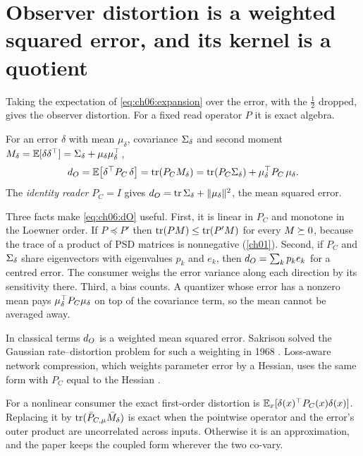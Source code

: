 
\section{Observer distortion is a weighted squared error, and its kernel is a quotient}\label{sec:ch06:distortion}

Taking the expectation of \cref{eq:ch06:expansion} over the error, with the $\tfrac12$ dropped, gives the observer distortion. For a fixed read operator $P$ it is exact algebra.

\begin{definition}\label{def:ch06:dO}
For an error $\delta$ with mean $\mu_\delta$, covariance $\Sigma_\delta$ and second moment $M_\delta=\mathbb{E}[\delta\delta^{\top}]=\Sigma_\delta+\mu_\delta\mu_\delta^{\top}$,
\begin{equation}\label{eq:ch06:dO}
d_O=\mathbb{E}\big[\delta^{\top} P_C\,\delta\big]=\operatorname{tr}(P_C M_\delta)=\operatorname{tr}(P_C\Sigma_\delta)+\mu_\delta^{\top} P_C\,\mu_\delta .
\end{equation}
The \emph{identity reader} $P_C=I$ gives $d_O=\operatorname{tr}\Sigma_\delta+\lVert \mu_\delta\rVert^2$, the mean squared error.
\end{definition}

Three facts make \cref{eq:ch06:dO} useful. First, it is linear in $P_C$ and monotone in the Loewner order. If $P\preceq P'$ then $\operatorname{tr}(P M)\le\operatorname{tr}(P' M)$ for every $M\succeq 0$, because the trace of a product of PSD matrices is nonnegative (\cref{ch01}). Second, if $P_C$ and $\Sigma_\delta$ share eigenvectors with eigenvalues $p_k$ and $e_k$, then $d_O=\sum_k p_k e_k$ for a centred error. The consumer weighs the error variance along each direction by its sensitivity there. Third, a bias counts. A quantizer whose error has a nonzero mean pays $\mu_\delta^{\top} P_C\mu_\delta$ on top of the covariance term, so the mean cannot be averaged away.

In classical terms $d_O$ is a weighted mean squared error. Sakrison solved the Gaussian rate--distortion problem for such a weighting in 1968 \cite{sakrison1968}. Loss-aware network compression, which weights parameter error by a Hessian, uses the same form with $P_C$ equal to the Hessian \cite{dong2019hawq}.

For a nonlinear consumer the exact first-order distortion is $\mathbb{E}_x[\delta(x)^{\top} P_C(x)\delta(x)]$. Replacing it by $\operatorname{tr}(\bar P_{C,\mu}\bar M_\delta)$ is exact when the pointwise operator and the error's outer product are uncorrelated across inputs. Otherwise it is an approximation, and the paper keeps the coupled form wherever the two co-vary.

